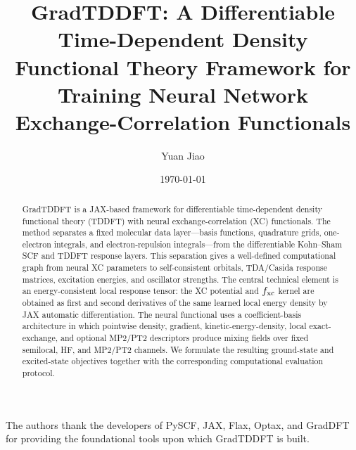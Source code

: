 \documentclass[%
 aip,
 jmp,
 amsmath,amssymb,
 reprint, onecolumn
]{revtex4-1}
\begin{document}
\title[GradTDDFT]{GradTDDFT: A Differentiable Time-Dependent Density Functional
 Theory Framework for Training Neural Network
 Exchange-Correlation Functionals}

\author{Yuan Jiao}

\date{\today}

\begin{abstract}
GradTDDFT is a JAX-based framework for differentiable
time-dependent density functional theory (TDDFT) with neural
exchange-correlation (XC) functionals. The method separates a
fixed molecular data layer---basis functions, quadrature grids,
one-electron integrals, and electron-repulsion integrals---from
the differentiable Kohn--Sham SCF and TDDFT response layers. This
separation gives a well-defined computational graph from neural
XC parameters to self-consistent orbitals, TDA/Casida response
matrices, excitation energies, and oscillator strengths. The central technical element
is an energy-consistent local response tensor: the XC potential and
$f_{\rm xc}$ kernel are obtained as first and second derivatives
of the same learned local energy density by JAX automatic
differentiation. The neural functional uses a coefficient-basis
architecture in which pointwise density, gradient,
kinetic-energy-density, local exact-exchange, and optional MP2/PT2
descriptors produce mixing fields over fixed semilocal, HF, and
MP2/PT2 channels. We formulate the resulting ground-state and
excited-state objectives together with
the corresponding computational evaluation protocol.
\end{abstract}


\maketitle








\begin{acknowledgments}
The authors thank the developers of PySCF, JAX, Flax, Optax, and
GradDFT for providing the foundational tools upon which GradTDDFT
is built.
\end{acknowledgments}
\end{document}
